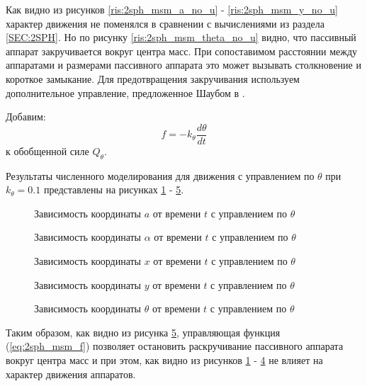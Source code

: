 Как видно из рисунков \ref{ris:2sph_msm_a_no_u} - \ref{ris:2sph_msm_y_no_u} характер движения не поменялся в сравнении с вычислениями из раздела \ref{SEC:2SPH}.
Но по рисунку \ref{ris:2sph_msm_theta_no_u} видно, что пассивный аппарат закручивается вокруг центра масс.
При сопоставимом расстоянии между аппаратами и размерами пассивного аппарата это может вызывать столкновение и короткое замыкание.
Для предотвращения закручивания используем дополнительное управление, предложенное Шаубом в \cite{3sph}.

Добавим:
\begin{equation}
\label{eq:2sph_msm_f}
	f = - k_\theta \frac{d\theta}{dt}
\end{equation}
к обобщенной силе $Q_\theta$.

Результаты численного моделирования для движения с управлением по $\theta$ при $k_\theta = 0.1$ представлены на рисунках \ref{ris:2sph_msm_a_full_u} - \ref{ris:2sph_msm_theta_full_u}.

\begin{figure}[H]
	\caption{Зависимость координаты $a$ от времени $t$ с управлением по $\theta$}
	\label{ris:2sph_msm_a_full_u}
\end{figure}
\begin{figure}[H]
	\caption{Зависимость координаты $\alpha$ от времени $t$ с управлением по $\theta$}
	\label{ris:2sph_msm_alpha_full_u}
\end{figure} 
\begin{figure}[H]
	\caption{Зависимость координаты $x$ от времени $t$ с управлением по $\theta$}
	\label{ris:2sph_msm_x_full_u}
\end{figure} 
\begin{figure}[H]
	\caption{Зависимость координаты $y$ от времени $t$ с управлением по $\theta$}
	\label{ris:2sph_msm_y_full_u}
\end{figure} 
\begin{figure}[H]
	\caption{Зависимость координаты $\theta$ от времени $t$ с управлением по $\theta$}
	\label{ris:2sph_msm_theta_full_u}
\end{figure}

Таким образом, как видно из рисунка \ref{ris:2sph_msm_theta_full_u}, управляющая функция (\ref{eq:2sph_msm_f}) позволяет остановить раскручивание пассивного аппарата вокруг центра масс и при этом, как видно из рисунков \ref{ris:2sph_msm_a_full_u} - \ref{ris:2sph_msm_y_full_u} не влияет на характер движения аппаратов.